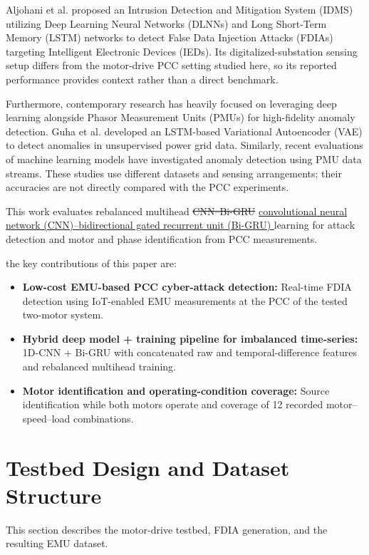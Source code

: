 \documentclass[conference,letterpaper]{IEEEtran}
\providecommand{\DIFadd}[1]{{\protect\color{blue}\uline{#1}}} %
\providecommand{\DIFdel}[1]{{\protect\color{red}\sout{#1}}}                      %
\providecommand{\DIFaddbegin}{} %
\providecommand{\DIFaddend}{} %
\providecommand{\DIFdelbegin}{} %
\providecommand{\DIFdelend}{} %
\begin{document}
Aljohani et al. \cite{aljohani2024} proposed an Intrusion Detection and Mitigation System (IDMS) utilizing Deep Learning Neural Networks (DLNNs) and Long Short-Term Memory (LSTM) networks to detect False Data Injection Attacks (FDIAs) targeting Intelligent Electronic Devices (IEDs). Its digitalized-substation sensing setup differs from the motor-drive PCC setting studied here, so its reported performance provides context rather than a direct benchmark.


Furthermore, contemporary research has heavily focused on leveraging deep learning alongside Phasor Measurement Units (PMUs) for high-fidelity anomaly detection. Guha et al. \cite{guha} developed an LSTM-based Variational Autoencoder (VAE) to detect anomalies in unsupervised power grid data. Similarly, recent evaluations of machine learning models \cite{pmu_lstm_2025} have investigated anomaly detection using PMU data streams. These studies use different datasets and sensing arrangements; their accuracies are not directly compared with the PCC experiments.


This work evaluates rebalanced multihead \DIFdelbegin \DIFdel{CNN--Bi-GRU }\DIFdelend \DIFaddbegin \DIFadd{convolutional neural network (CNN)--bidirectional gated recurrent unit (Bi-GRU) }\DIFaddend learning for attack detection and motor and phase identification from PCC measurements.

the key contributions of this paper are:
\begin{itemize}
    \item \textbf{Low-cost EMU-based PCC cyber-attack detection:} Real-time FDIA detection using IoT-enabled EMU measurements at the PCC of the tested two-motor system.
    \item \textbf{Hybrid deep model + training pipeline for imbalanced time-series:} 1D-CNN + Bi-GRU with concatenated raw and temporal-difference features and rebalanced multihead training.
    \item \textbf{Motor identification and operating-condition coverage:} Source identification while both motors operate and coverage of 12 recorded motor--speed--load combinations.
\end{itemize}




\section{Testbed Design and Dataset Structure}
This section describes the motor-drive testbed, FDIA generation, and the resulting EMU dataset.
\end{document}

